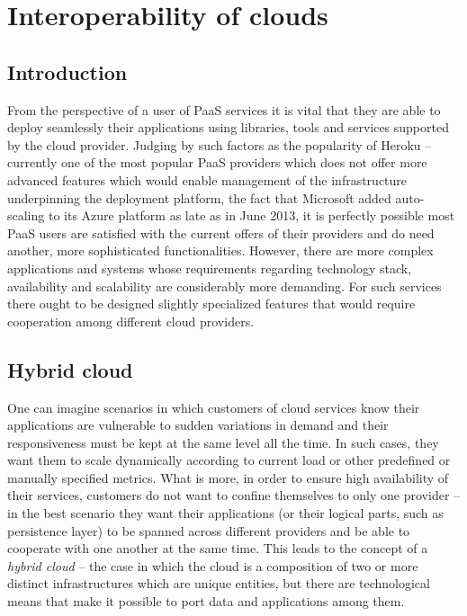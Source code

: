 \chapter{Interoperability of clouds}


\section{Introduction}
From the perspective of a user of PaaS services it is vital that they are able to deploy seamlessly their applications using libraries, tools and services supported by the cloud provider\cite{MeGr11}. Judging by such factors as the popularity of Heroku -- currently one of the most popular PaaS providers which does not offer more advanced features which would enable management of the infrastructure underpinning the deployment platform, the fact that Microsoft added auto-scaling to its Azure platform as late as in June 2013, it is perfectly possible most PaaS users are satisfied with the current offers of their providers and do need another, more sophisticated functionalities. However, there are more complex applications and systems whose requirements regarding technology stack, availability and scalability are considerably more demanding. For such services there ought to be designed slightly specialized features that would require cooperation among different cloud providers.

\section{Hybrid cloud}
One can imagine scenarios in which customers of cloud services know their applications are vulnerable to sudden variations in demand and their responsiveness must be kept at the same level all the time. In such cases, they want them to scale dynamically according to current load or other predefined or manually specified metrics. What is more, in order to ensure high availability of their services, customers do not want to confine themselves to only one provider -- in the best scenario they want their applications (or their logical parts, such as persistence layer) to be spanned across different providers and be able to cooperate with one another at the same time. This leads to the concept of a \emph{hybrid cloud}\cite{MeGr11} -- the case in which the cloud is a composition of two or more distinct infrastructures which are unique entities, but there are technological means that make it possible to port data and applications among them.

